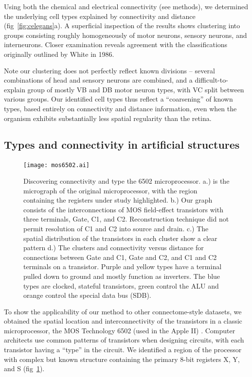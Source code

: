 \documentclass{article}
\begin{document}
{Using both the chemical and electrical connectivity (see methods), we
determined the underlying cell types explained by connectivity and
distance (fig~\ref{fig:celegans}a). A superficial inspection of the
results shows clustering into groups consisting roughly homogeneously
of motor neurons, sensory neurons, and interneurons. Closer
examination reveals agreement with the classifications originally
outlined by White in 1986.

Note our clustering does not perfectly reflect known divisions --
several combinations of head and sensory neurons are combined, and a
difficult-to-explain group of mostly VB and DB motor neuron types,
with VC split between various groups. Our identified cell types thus
reflect a ``coarsening'' of known types, based entirely on
connectivity and distance information, even when the organism exhibits
substantially less spatial regularity than the retina.

\subsection*{Types and connectivity in artificial structures}
\begin{figure}
  \centering 
  \centerline{\texttt{[image: mos6502.ai]}}
  \caption{Discovering connectivity and type the 6502 microprocessor.
    a.) is the micrograph of the original microprocessor, with the
    region containing the registers under study highlighted. b.) Our
    graph consists of the interconnections of MOS field-effect
    transistors with three terminals, Gate, C1, and C2. Reconstruction
    technique did not permit resolution of C1 and C2 into source and
    drain. c.) The spatial distribution of the transistors in each
    cluster show a clear pattern d.) The clusters and connectivity
    versus distance for connections between Gate and C1, Gate and C2,
    and C1 and C2 terminals on a transistor. Purple and yellow types have a
    terminal pulled down to ground and mostly function as
    inverters. The blue types are clocked, stateful transistors, green
    control the ALU and orange control the special data bus (SDB).}
  \label{fig:mos6502}
\end{figure}


To show the applicability of our method to other connectome-style
datasets, we obtained the spatial location and interconnectivity of
the transistors in a classic microprocessor, the MOS Technology 6502
(used in the Apple II) \autocite{James2010}. Computer architects use
common patterns of transistors when designing circuits, with each
transistor having a ``type'' in the circuit. We identified a region of
the processor with complex but known structure containing the primary
8-bit registers X, Y, and S (fig~\ref{fig:mos6502}).

}
\end{document}
